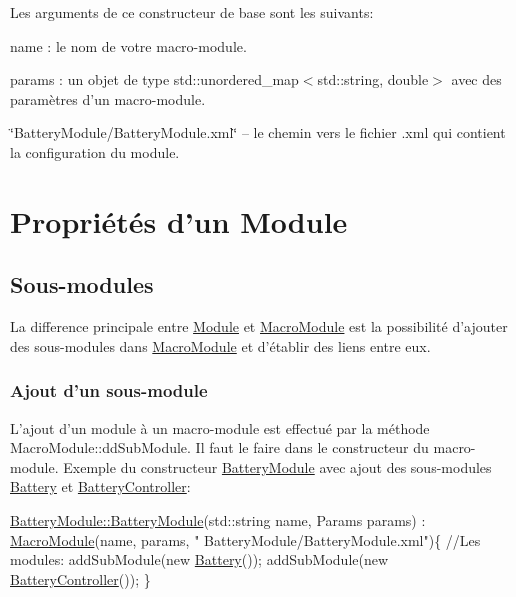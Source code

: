 Les arguments de ce constructeur de base sont les suivants\-:
\begin{DoxyEnumerate}
\item name \-: le nom de votre macro-\/module.
\item params \-: un objet de type {\ttfamily std\-::unordered\-\_\-map$<$std\-::string, double$>$} avec des paramètres d'un macro-\/module.
\item \char`\"{}\-Battery\-Module/\-Battery\-Module.\-xml\char`\"{} – le chemin vers le fichier {\ttfamily .xml} qui contient la configuration du module.
\end{DoxyEnumerate}\hypertarget{docModule_properties}{}\section{Propriétés d'un Module}\label{docModule_properties}
\hypertarget{docMacroModule_submodules}{}\subsection{Sous-\/modules}\label{docMacroModule_submodules}
La difference principale entre \hyperlink{classModule}{Module} et \hyperlink{classMacroModule}{Macro\-Module} est la possibilité d'ajouter des sous-\/modules dans \hyperlink{classMacroModule}{Macro\-Module} et d'établir des liens entre eux. \hypertarget{docMacroModule_addsubmodule}{}\subsubsection{Ajout d'un sous-\/module}\label{docMacroModule_addsubmodule}
L'ajout d'un module à un macro-\/module est effectué par la méthode Macro\-Module\-::dd\-Sub\-Module. Il faut le faire dans le constructeur du macro-\/module. Exemple du constructeur \hyperlink{classBatteryModule}{Battery\-Module} avec ajout des sous-\/modules \hyperlink{classBattery}{Battery} et \hyperlink{classBatteryController}{Battery\-Controller}\-: 
\begin{DoxyCode}
\hyperlink{classBatteryModule_a2fb494ef5f124c38c0fdf9ccfb31918f}{BatteryModule::BatteryModule}(std::string name, 
      Params params) : \hyperlink{classMacroModule}{MacroModule}(name, params, \textcolor{stringliteral}{"
      BatteryModule/BatteryModule.xml"})\{
    \textcolor{comment}{//Les modules:}
    addSubModule(\textcolor{keyword}{new} \hyperlink{classBattery}{Battery}());
    addSubModule(\textcolor{keyword}{new} \hyperlink{classBatteryController}{BatteryController}());        \}
\end{DoxyCode}
